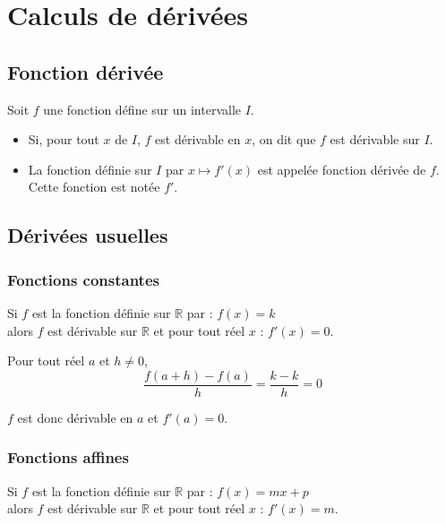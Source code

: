 \documentclass[french]{book}
\newcommand{\R}{\mathbb {R}}
\begin{document}
\newpage
\section{Calculs de dérivées}
\subsection{Fonction dérivée}
\begin{defn}
Soit $f$ une fonction défine sur un intervalle $I$.
\begin{itemize}
\item Si, pour tout $x$ de $I$, $f$ est dérivable en $x$, on dit que $f$ est dérivable sur $I$.
\item La fonction définie sur $I$ par $x \longmapsto f'(x)$ est appelée fonction dérivée de $f$. Cette fonction est notée $f'$.
\end{itemize}
\end{defn}

\subsection{Dérivées usuelles}
\subsubsection*{Fonctions constantes}
\begin{prop}

Si $f$ est la fonction définie sur $\R$ par :  $f(x)=k$ \\
alors $f$ est dérivable sur $\R$ et pour tout réel $x$ :  $f'(x)=0$.

\end{prop}

\begin{demo}
Pour tout réel $a$ et $h\neq 0$, 
\[\dfrac{f(a+h)-f(a)}{h}=\dfrac{k-k}{h}=0\]

$f$ est donc dérivable en $a$ et $f'(a)=0$.
\end{demo}

\subsubsection*{Fonctions affines}
\begin{prop}
Si $f$ est la fonction définie sur $\R$ par :  $f(x)=mx+p$ \\
alors $f$ est dérivable sur $\R$ et pour tout réel $x$ :  $f'(x)=m$.
\end{prop}
\end{document}
